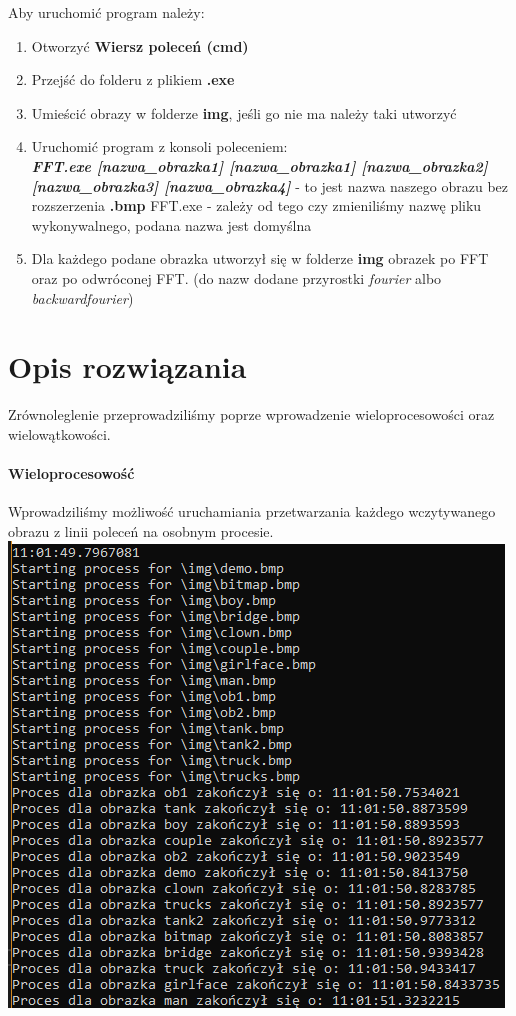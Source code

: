 Aby uruchomić program należy:
\begin{enumerate}
	\item Otworzyć \textbf{Wiersz poleceń (cmd)}
	\item Przejść do folderu z plikiem \textbf{.exe}
	\item Umieścić obrazy w folderze \textbf{img}, jeśli go nie ma należy taki utworzyć
	\item Uruchomić program z konsoli poleceniem:\\
	\textbf{\textit{FFT.exe [nazwa\_obrazka1] [nazwa\_obrazka1] [nazwa\_obrazka2] [nazwa\_obrazka3] [nazwa\_obrazka4]}}
	 - to jest nazwa naszego obrazu bez rozszerzenia \textbf{.bmp}
	\subitem FFT.exe - zależy od tego czy zmieniliśmy nazwę pliku wykonywalnego, podana nazwa jest domyślna
	\item Dla każdego podane obrazka utworzył się w folderze \textbf{img} obrazek po FFT oraz po odwróconej FFT. (do nazw dodane przyrostki \textit{fourier} albo \textit{backwardfourier})
\end{enumerate} 
\section{Opis rozwiązania}

Zrównoleglenie przeprowadziliśmy poprze wprowadzenie wieloprocesowości oraz wielowątkowości.
\paragraph{Wieloprocesowość} Wprowadziliśmy możliwość uruchamiania przetwarzania każdego wczytywanego obrazu z linii poleceń na osobnym procesie.\\
	\includegraphics[scale=0.8]{figures/Par13Wat4.png}
